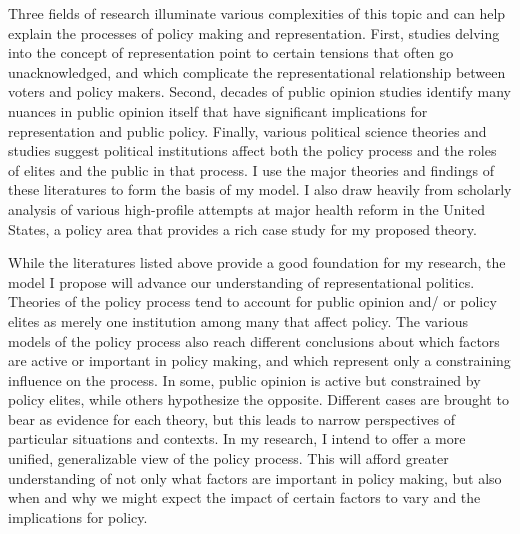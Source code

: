 Three fields of research illuminate various complexities of this topic and can help explain the processes of policy making and representation. First, studies delving into the concept of representation point to certain tensions that often go unacknowledged, and which complicate the representational relationship between voters and policy makers. Second, decades of public opinion studies identify many nuances in public opinion itself that have significant implications for representation and public policy. Finally, various political science theories and studies suggest political institutions affect both the policy process and the roles of elites and the public in that process. I use the major theories and findings of these literatures to form the basis of my model. I also draw heavily from scholarly analysis of various high-profile attempts at major health reform in the United States, a policy area that provides a rich case study for my proposed theory.

While the literatures listed above provide a good foundation for my research, the model I propose will advance our understanding of representational politics. Theories of the policy process tend to account for public opinion and/ or policy elites as merely one institution among many that affect policy. The various models of the policy process also reach different conclusions about which factors are active or important in policy making, and which represent only a constraining influence on the process. In some, public opinion is active but constrained by policy elites, while others hypothesize the opposite. Different cases are brought to bear as evidence for each theory, but this leads to narrow perspectives of particular situations and contexts. In my research, I intend to offer a more unified, generalizable view of the policy process. This will afford greater understanding of not only what factors are important in policy making, but also when and why we might expect the impact of certain factors to vary and the implications for policy.




